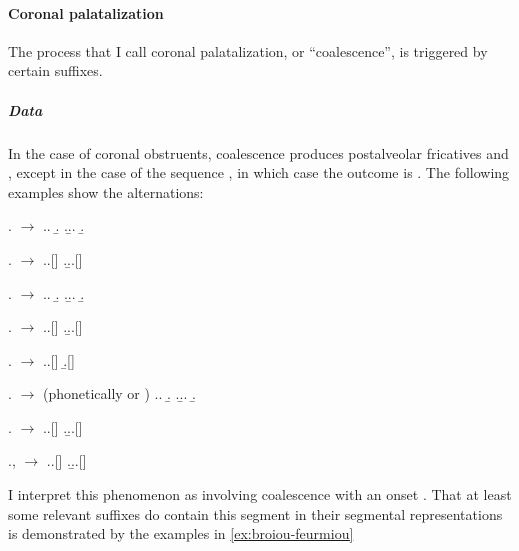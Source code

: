 \paragraph{Coronal palatalization}
\label{sec:coron-palat}

The process that I call coronal palatalization, or \enquote{coalescence}, is triggered by certain suffixes.

\subparagraph{Data}
\label{sec:data-7}

In the case of coronal obstruents, coalescence produces postalveolar fricatives \ipa{[ʃ]} and \ipa{[ʒ]}, except in the case of the sequence \ipa{[st]}, in which case the outcome is \ipa{[sʧ]}. The following examples show the alternations:

\ex.\ipa{[d]} $\rightarrow$ \ipa{[ʒ]}
\a.\a.
\b.
\z.\b.\a.
\b.

\ex.\ipa{[t]} $\rightarrow$ 
\a.\a.[]
\z.\b.\a.[]

\ex. $\rightarrow$ \ipa{[ʒ]}
\a.\a.
\b.
\z.\b.\a.
\b.

\ex.\ipa{[s]} $\rightarrow$ \ipa{[ʃ]}
\a.\a.[]
\z.\b.\a.[]

\ex.\ipa{[st]} $\rightarrow$ \ipa{[sʧ]}
\a.\a.[]
\b.[]\label{lostou}

\ex.\ipa{[n]} $\rightarrow$  (phonetically  or )
\a.\a.
\b.
\z.\b.\a.
\b.

\ex.\ipa{[l]} $\rightarrow$ \ipa{[j]}
\a.\a.[]
\z.\b.\a.[]

\ex.\ipa{[ˌɛl]}, \ipa{[əl]} $\rightarrow$ \ipa{[i]}
\a.\a.[]
\z.\b.\a.[]


I interpret this phenomenon as involving coalescence with an onset \ipa{[i]}. That at least some relevant suffixes do contain this segment in their segmental representations is demonstrated by the examples in \ref{ex:broiou-feurmiou}

